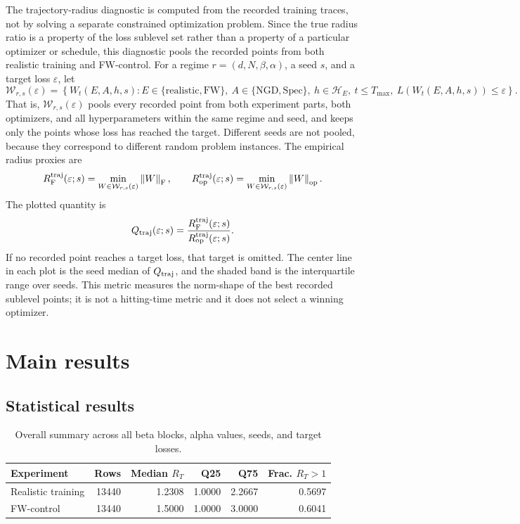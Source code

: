 \documentclass[11pt]{article}
\newcommand{\norm}[1]{\left\lVert #1 \right\rVert}
\newcommand{\F}{\mathrm{F}}
\newcommand{\op}{\mathrm{op}}
\newcommand{\Tmax}{T_{\max}}
\newcommand{\eps}{\varepsilon}
\newcommand{\tratio}{R_T}
\begin{document}
The trajectory-radius diagnostic is computed from the recorded training traces, not by solving a separate constrained optimization problem. Since the true radius ratio is a property of the loss sublevel set rather than a property of a particular optimizer or schedule, this diagnostic pools the recorded points from both realistic training and FW-control. For a regime $r=(d,N,\beta,\alpha)$, a seed $s$, and a target loss $\eps$, let
\[
  \mathcal{W}_{r,s}(\eps)
  =
  \left\{
    W_t(E,A,h,s):
    E\in\{\mathrm{realistic},\mathrm{FW}\},\
    A\in\{\mathrm{NGD},\mathrm{Spec}\},\
    h\in\mathcal{H}_E,\
    t\leq \Tmax,\
    L(W_t(E,A,h,s))\leq \eps
  \right\}.
\]
That is, $\mathcal{W}_{r,s}(\eps)$ pools every recorded point from both experiment parts, both optimizers, and all hyperparameters within the same regime and seed, and keeps only the points whose loss has reached the target. Different seeds are not pooled, because they correspond to different random problem instances. The empirical radius proxies are
\[
  R_{\F}^{\rm traj}(\eps;s)
  =
  \min_{W\in\mathcal{W}_{r,s}(\eps)} \norm{W}_{\F},
  \qquad
  R_{\op}^{\rm traj}(\eps;s)
  =
  \min_{W\in\mathcal{W}_{r,s}(\eps)} \norm{W}_{\op}.
\]
The plotted quantity is
\[
  Q_{\rm traj}(\eps;s)
  =
  \frac{R_{\F}^{\rm traj}(\eps;s)}{R_{\op}^{\rm traj}(\eps;s)}.
\]
If no recorded point reaches a target loss, that target is omitted. The center line in each plot is the seed median of $Q_{\rm traj}$, and the shaded band is the interquartile range over seeds. This metric measures the norm-shape of the best recorded sublevel points; it is not a hitting-time metric and it does not select a winning optimizer.


\section{Main results}
\subsection{Statistical results}
\begin{table}[H]
\centering
\caption{Overall summary across all beta blocks, alpha values, seeds, and target losses.}
\begin{tabular}{lrrrrr}
\toprule
Experiment & Rows & Median $\tratio$ & Q25 & Q75 & Frac. $\tratio>1$ \\
\midrule
Realistic training & 13440 & 1.2308 & 1.0000 & 2.2667 & 0.5697 \\
FW-control & 13440 & 1.5000 & 1.0000 & 3.0000 & 0.6041 \\
\bottomrule
\end{tabular}
\end{table}
\end{document}
